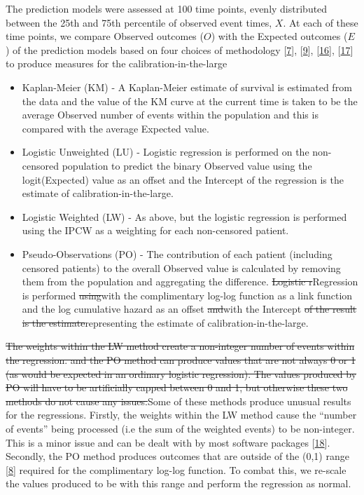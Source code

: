 \documentclass[
]{article}
\providecommand{\tightlist}{%
  \setlength{\itemsep}{0pt}\setlength{\parskip}{0pt}}
\begin{document}
The prediction models were assessed at 100 time points, evenly distributed between the 25th and 75th percentile of observed event times, \(X\). At each of these time points, we compare Observed outcomes (\(O\)) with the Expected outcomes (\(E\)) of the prediction models based on four choices of methodology {[}\protect\hyperlink{ref-royston_tools_2014}{7}{]}, {[}\protect\hyperlink{ref-royston_tools_2015}{9}{]}, {[}\protect\hyperlink{ref-riley_prognosis_2019}{16}{]}, {[}\protect\hyperlink{ref-andersen_pseudo-observations_2010}{17}{]} to produce measures for the calibration-in-the-large
\begin{itemize}
\tightlist
\item
  Kaplan-Meier (KM) - A Kaplan-Meier estimate of survival is estimated from the data and the value of the KM curve at the current time is taken to be the average Observed number of events within the population and this is compared with the average Expected value.
\item
  Logistic Unweighted (LU) - Logistic regression is performed on the non-censored population to predict the binary Observed value using the logit(Expected) value as an offset and the Intercept of the regression is the estimate of calibration-in-the-large.
\item
  Logistic Weighted (LW) - As above, but the logistic regression is performed using the IPCW as a weighting for each non-censored patient.
\item
  Pseudo-Observations (PO) - The contribution of each patient (including censored patients) to the overall Observed value is calculated by removing them from the population and aggregating the difference. \sout{Logistic r}Regression is performed \sout{using}with the complimentary log-log function as a link function and the log cumulative hazard as an offset \sout{and}with the Intercept \sout{of the result is the estimate}representing the estimate of calibration-in-the-large.
\end{itemize}
\sout{The weights within the LW method create a non-integer number of events within the regression. and the PO method can produce values that are not always 0 or 1 (as would be expected in an ordinary logistic regression). The values produced by PO will have to be artificially capped between 0 and 1, but otherwise these two methods do not cause any issues.}Some of these methods produce unusual results for the regressions. Firstly, the weights within the LW method cause the ``number of events'' being processed (i.e the sum of the weighted events) to be non-integer. This is a minor issue and can be dealt with by most software packages {[}\protect\hyperlink{ref-wildscop_biostatistics_2013}{18}{]}. Secondly, the PO method produces outcomes that are outside of the (0,1) range {[}\protect\hyperlink{ref-perme_checking_2008}{8}{]} required for the complimentary log-log function. To combat this, we re-scale the values produced to be with this range and perform the regression as normal.
\end{document}
